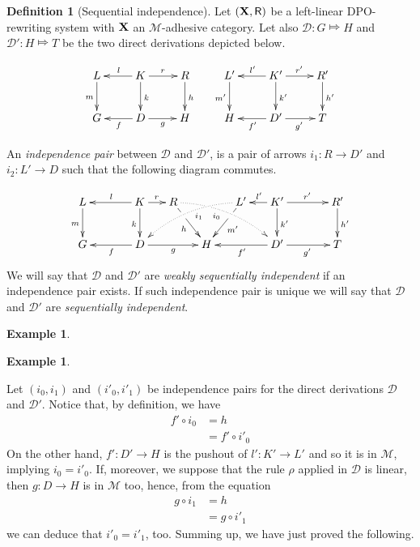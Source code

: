 \documentclass[a4paper]{article}
\def\R{\mathsf{R}}
\def\X{\textbf {\textup{X}}}
\newcommand{\dder}[1]{\mathscr{#1}}
\theoremstyle{definition}
\newtheorem{definition}[theorem]{Definition}
\newtheorem{example}[theorem]{Example}
\begin{document}
\begin{definition}[Sequential independence]
  \label{de:sequential-independence}
  Let $(\X, \R)$ be a left-linear DPO-rewriting system with $\X$ an $\mathcal{M}$-adhesive category. Let also $\dder{D}\colon G\Mapsto H$ and $\dder{D'}\colon H\Mapsto T$ be the two direct derivations depicted below.
	
	\[\xymatrix{L \ar[d]_{m}& K \ar[d]^{k}\ar[l]_{l} \ar[r]^{r} & R \ar[d]^{h} & L' \ar[d]_{m'}& K' \ar[d]^{k'}\ar[l]_{l'} \ar[r]^{r'} & R' \ar[d]^{h'}\\G & \ar[l]^{f} D \ar[r]_{g}& H & H & \ar[l]^{f'} D' \ar[r]_{g'}& T}\]
	
	An \emph{independence pair} between $\dder{D}$ and $\dder{D'}$, is a pair of  arrows $i_1\colon R\to D'$ and $i_2\colon L'\to D$ such that the following diagram commutes.
	
	\[\xymatrix@C=15pt{L \ar[d]_{m}&& K \ar[d]_{k}\ar[ll]_{l} \ar[r]^{r} & R \ar@/^.35cm/@{.>}[drrr]|(.3)\hole_(.4){i_0} \ar[dr]|(.3)\hole_{h} && L' \ar@/_.35cm/@{.>}[dlll]^(.4){i_1} \ar[dl]|(.3)\hole^{m'}& K' \ar[d]^{k'}\ar[l]_{l'} \ar[rr]^{r'} && R' \ar[d]^{h'}\\G && \ar[ll]^{f} D \ar[rr]_{g}&& H  && \ar[ll]^{f'} D' \ar[rr]_{g'}&& T}\]
	We will say that $\dder{D}$ and $\dder{D'}$ are \emph{weakly sequentially independent} if an independence pair exists. If such independence pair is unique we will say that $\dder{D}$ and $\dder{D'}$ are \emph{sequentially independent}.
\end{definition}

\begin{example}
\end{example}
\begin{example}
\end{example}


 Let $(i_0, i_1)$ and $(i'_0, i'_1)$ be independence pairs for the direct derivations $\dder{D}$ and $\dder{D'}$. Notice that, by definition, we have
	\begin{align*}f'\circ i_0&=h\\&=f'\circ i'_0
	\end{align*}
	On the other hand, 
	$f'\colon D'\to H$ is  the pushout of $l'\colon K'\to L'$ and so it is in $\mathcal{M}$, implying $i_0=i'_0$. If, moreover, we suppose that the rule $\rho$ applied in $\dder{D}$ is linear, then $g\colon D\to H$ is in $\mathcal{M}$ too, hence, from the equation
	\begin{align*}
		g\circ i_1&=h \\&= g\circ i'_1
	\end{align*}
	we can deduce that $i'_0=i'_1$, too. Summing up, we have just proved the following.
	
\end{document}
